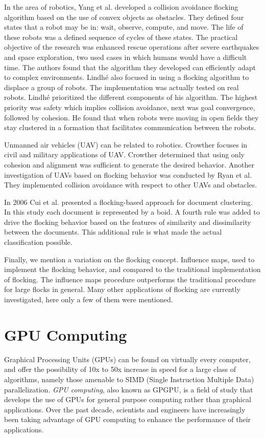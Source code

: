 In the area of robotics, Yang et al. developed a collision avoidance flocking algorithm based on the use of convex objects as obstacles\cite{flockingRobots}. They defined four states that a robot may be in: wait, observe, compute, and move. The life of these robots was a defined sequence of cycles of these states. The practical objective of the research was enhanced rescue operations after severe earthquakes and space exploration, two used cases in which humans would have a difficult time. The authors found that the algorithm they developed can efficiently adapt to complex environments. Lindh\'{e} also focused in using a flocking algorithm to displace a group of robots\cite{flockingRobotsThesis}. The implementation was actually tested on real robots. Lindh\'{e} prioritized the different components of his algorithm. The highest priority was safety which implies collision avoidance, next was goal convergence, followed by cohesion. He found that when robots were moving in open fields they stay clustered in a formation that facilitates communication between the robots. 

Unmanned air vehicles (UAV) can be related to robotics. Crowther focuses in civil and military applications of  UAV\cite{flockingUAV}. Crowther determined that using only cohesion and alignment was sufficient to generate the desired behavior. Another investigation of UAVs based on flocking behavior was conducted by Ryan et al\cite{UAVControl}. They implemented collision avoidance with respect to other UAVs and obstacles. 

In 2006 Cui et al. presented a flocking-based approach for document clustering\cite{document1}. In this study each document is represented by a boid. A fourth rule was added to drive the flocking behavior based on the features of similarity and dissimilarity between the documents. This additional rule is what made the actual classification possible. 

Finally, we mention a variation on the flocking concept.  Influence maps, used to implement the flocking behavior, and compared to the traditional implementation of flocking\cite{flockingInfluenceMaps}. The influence maps procedure outperforms the traditional procedure for large flocks in general. Many other applications of flocking are currently investigated, here only a few of them were mentioned.

\section{GPU Computing}
Graphical Processing Units (GPUs) can be found on virtually every computer, and offer the possibility of 10x to 50x increase in speed for a large class of algorithms, namely those amenable to SIMD (Single Instruction Multiple Data)  parallelization. \textit{GPU computing}, also known as GPGPU, is a field of study that develops the use of GPUs for general purpose computing rather than graphical applications. Over the past decade, scientists and engineers have increasingly been taking advantage of GPU computing to enhance the performance of their applications.

